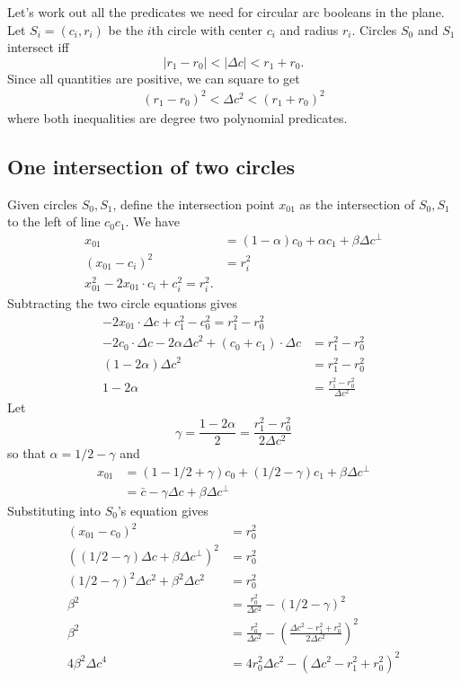 \documentclass[11pt]{article}
\begin{document}
Let's work out all the predicates we need for circular arc booleans in the plane.  Let $S_i = (c_i,r_i)$ be the $i$th
circle with center $c_i$ and radius $r_i$.  Circles $S_0$ and $S_1$ intersect iff
$$ | r_1 - r_0 | < |\Delta c| < r_1 + r_0. $$
Since all quantities are positive, we can square to get
\begin{align} \label{two-circles}
(r_1 - r_0)^2 < \Delta c^2 < (r_1 + r_0)^2
\end{align}
where both inequalities are degree two polynomial predicates.

\subsection{One intersection of two circles}

Given circles $S_0, S_1$, define the intersection point $x_{01}$ as the intersection
of $S_0,S_1$ to the left of line $c_0c_1$.  We have
\begin{align*}
x_{01} &= (1-\alpha) c_0 + \alpha c_1 + \beta \Delta c^\perp \\
(x_{01} - c_i)^2 &= r_i^2 \\
x_{01}^2 - 2x_{01} \cdot c_i + c_i^2 = r_i^2.
\end{align*}
Subtracting the two circle equations gives
\begin{align*}
-2x_{01} \cdot \Delta c + c_1^2 - c_0^2 = r_1^2 - r_0^2 \\
-2c_0 \cdot \Delta c -2\alpha {\Delta c}^2 + (c_0 + c_1) \cdot \Delta c &= r_1^2 - r_0^2 \\
(1-2\alpha) {\Delta c}^2 &= r_1^2 - r_0^2 \\
1 - 2 \alpha &= \frac{r_1^2 - r_0^2}{\Delta c^2}
\end{align*}
Let
$$\gamma = \frac{1 - 2\alpha}{2} = \frac{r_1^2 - r_0^2}{2\Delta c^2}$$
so that $\alpha = 1/2 - \gamma$ and
\begin{align*}
x_{01} &= (1-1/2 + \gamma) c_0 + (1/2 - \gamma) c_1 + \beta \Delta c^\perp \\
       &= \bar{c} - \gamma \Delta c + \beta \Delta c^\perp
\end{align*}
Substituting into $S_0$'s equation gives
\begin{align*}
(x_{01} - c_0)^2 &= r_0^2 \\
\left((1/2 - \gamma) \Delta c + \beta \Delta c^\perp \right)^2 &= r_0^2 \\
(1/2 - \gamma)^2 \Delta c^2 + \beta^2 \Delta c^2 &= r_0^2 \\
\beta^2 &= \frac{r_0^2}{\Delta c^2} - (1/2 - \gamma)^2 \\
\beta^2 &= \frac{r_0^2}{\Delta c^2} - \left(\frac{\Delta c^2 - r_1^2 + r_0^2}{2 \Delta c^2}\right)^2 \\
4 \beta^2 \Delta c^4 &= 4 r_0^2 \Delta c^2 - \left( \Delta c^2 - r_1^2 + r_0^2 \right)^2
\end{align*}
\end{document}
